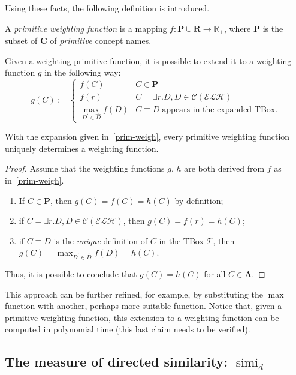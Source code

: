 \documentclass[]{llncs}
\DeclareMathOperator{\simi}{simi}
\begin{document}
  Using these facts, the following definition is introduced.
  \begin{definition}
    A \emph{primitive weighting function} is a mapping \(f \colon \mathbf{P} \cup \mathbf{R} \to \mathbb{R}_+\), where \(\mathbf{P}\) is the subset of \(\mathbf{C}\) of \emph{primitive} concept names.
  \end{definition}
  Given a weighting primitive function, it is possible to extend it to a weighting function \(g\) in the following way:
  \begin{equation}\label{prim-weigh}
    g(C) :=
    \begin{cases}
      f(C) & C \in \mathbf{P} \\
      f(r) & C = \exists{}r.D, D \in \mathcal{C}(\mathcal{ELH}) \\
      \max_{D^\prime \in \widehat{D}}f(D) & C \equiv D \; \text{appears in the expanded TBox.}
    \end{cases}
  \end{equation}
  \begin{proposition}
    With the expansion given in~\eqref{prim-weigh}, every primitive weighting function uniquely determines a weighting function.
  \end{proposition}
  \begin{proof}
    Assume that the weighting functions \(g\), \(h\) are both derived from \(f\) as in~\eqref{prim-weigh}.
    \begin{enumerate}
      \item If \(C \in \mathbf{P}\), then
      \(g(C) = f(C) = h(C)\) by definition;
      \item if \(C =  \exists{}r.D, D \in \mathcal{C}(\mathcal{ELH})\), then \(g(C) = f(r) = h(C)\);
      \item if \(C \equiv D\) is the \emph{unique} definition of \(C\) in the TBox \(\mathcal{T}\), then
      \(g(C) = \max_{D^\prime \in \widehat{D}}f(D) = h(C)\).
    \end{enumerate}
    Thus, it is possible to conclude that \(g(C) = h(C)\) for all \(C \in \mathbf{A}\).
  \end{proof}
  This approach can be further refined, for example, by substituting the \(\max\) function with another, perhaps more suitable function.
  Notice that, given a primitive weighting function, this extension to a weighting function can be computed in polynomial time (this last claim needs to be verified).

\subsection{The measure of directed similarity: \(\simi_d\)}
\end{document}
